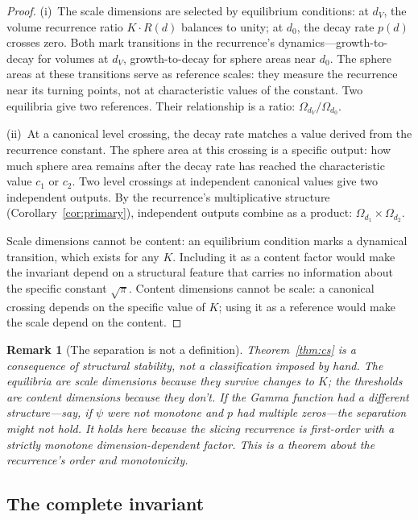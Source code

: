 \documentclass[11pt,a4paper]{article}
\newtheorem{remark}[theorem]{Remark}
\begin{document}
\begin{proof}
(i)~The scale dimensions are selected by equilibrium conditions: at $d_V$,
the volume recurrence ratio $K\cdot R(d)$ balances to unity; at $d_0$,
the decay rate $p(d)$ crosses zero. Both mark transitions in the
recurrence's dynamics---growth-to-decay for volumes at $d_V$,
growth-to-decay for sphere areas near $d_0$. The sphere areas at these
transitions serve as reference scales: they measure the recurrence near
its turning points, not at characteristic values of the constant.
Two equilibria give two references. Their relationship is a ratio:
$\Omega_{d_V}/\Omega_{d_0}$.

(ii)~At a canonical level crossing, the decay rate matches a value derived
from the recurrence constant. The sphere area at this crossing is a
specific output: how much sphere area remains after the decay rate has
reached the characteristic value $c_1$ or $c_2$. Two level crossings at
independent canonical values give two independent outputs. By the
recurrence's multiplicative structure
(Corollary~\ref{cor:primary}), independent outputs combine as a product:
$\Omega_{d_1}\times\Omega_{d_2}$.

Scale dimensions cannot be content: an equilibrium condition marks a
dynamical transition, which exists for any $K$. Including it as a
content factor would make the invariant depend on a structural feature
that carries no information about the specific constant $\sqrt{\pi}$.
Content dimensions cannot be scale: a canonical crossing depends on the
specific value of $K$; using it as a reference would make the scale
depend on the content.
\end{proof}

\begin{remark}[The separation is not a definition]
Theorem~\ref{thm:cs} is a consequence of structural stability, not a
classification imposed by hand. The equilibria are scale dimensions because
they survive changes to $K$; the thresholds are content dimensions because
they don't. If the Gamma function had a different structure---say, if
$\psi$ were not monotone and $p$ had multiple zeros---the separation might
not hold. It holds here because the slicing recurrence is first-order with
a strictly monotone dimension-dependent factor. This is a theorem about
the recurrence's order and monotonicity.
\end{remark}

\subsection{The complete invariant}
\end{document}
